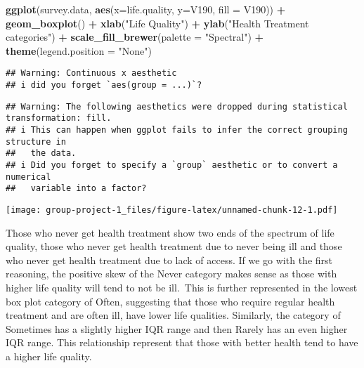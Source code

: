 \documentclass[
]{article}
\newenvironment{Shaded}{\begin{snugshade}}{\end{snugshade}}
\newcommand{\AttributeTok}[1]{\textcolor[rgb]{0.13,0.29,0.53}{#1}}
\newcommand{\FunctionTok}[1]{\textcolor[rgb]{0.13,0.29,0.53}{\textbf{#1}}}
\newcommand{\NormalTok}[1]{#1}
\newcommand{\SpecialCharTok}[1]{\textcolor[rgb]{0.81,0.36,0.00}{\textbf{#1}}}
\newcommand{\StringTok}[1]{\textcolor[rgb]{0.31,0.60,0.02}{#1}}
\begin{document}
\begin{Shaded}
\begin{Highlighting}[]
\FunctionTok{ggplot}\NormalTok{(survey.data, }\FunctionTok{aes}\NormalTok{(}\AttributeTok{x=}\NormalTok{life.quality, }\AttributeTok{y=}\NormalTok{V190, }\AttributeTok{fill =}\NormalTok{ V190)) }\SpecialCharTok{+} 
  \FunctionTok{geom\_boxplot}\NormalTok{() }\SpecialCharTok{+}
  \FunctionTok{xlab}\NormalTok{(}\StringTok{"Life Quality"}\NormalTok{) }\SpecialCharTok{+}
  \FunctionTok{ylab}\NormalTok{(}\StringTok{"Health Treatment categories"}\NormalTok{) }\SpecialCharTok{+}
  \FunctionTok{scale\_fill\_brewer}\NormalTok{(}\AttributeTok{palette =} \StringTok{"Spectral"}\NormalTok{) }\SpecialCharTok{+}
  \FunctionTok{theme}\NormalTok{(}\AttributeTok{legend.position =} \StringTok{"None"}\NormalTok{)}
\end{Highlighting}
\end{Shaded}

\begin{verbatim}
## Warning: Continuous x aesthetic
## i did you forget `aes(group = ...)`?
\end{verbatim}

\begin{verbatim}
## Warning: The following aesthetics were dropped during statistical transformation: fill.
## i This can happen when ggplot fails to infer the correct grouping structure in
##   the data.
## i Did you forget to specify a `group` aesthetic or to convert a numerical
##   variable into a factor?
\end{verbatim}

\texttt{[image: group-project-1\_files/figure-latex/unnamed-chunk-12-1.pdf]}

Those who never get health treatment show two ends of the spectrum of
life quality, those who never get health treatment due to never being
ill and those who never get health treatment due to lack of access. If
we go with the first reasoning, the positive skew of the Never category
makes sense as those with higher life quality will tend to not be
ill.~This is further represented in the lowest box plot category of
Often, suggesting that those who require regular health treatment and
are often ill, have lower life qualities. Similarly, the category of
Sometimes has a slightly higher IQR range and then Rarely has an even
higher IQR range. This relationship represent that those with better
health tend to have a higher life quality.
\end{document}
